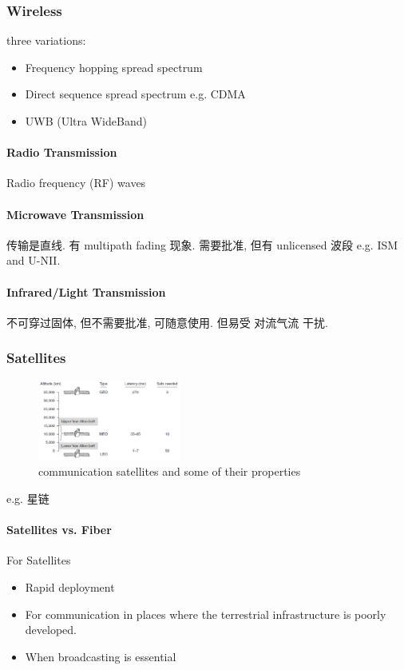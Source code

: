\subsubsection{Wireless}
three variations:
\begin{itemize}
    \item Frequency hopping spread spectrum
    \item Direct sequence spread spectrum e.g. CDMA
    \item UWB (Ultra WideBand)
\end{itemize}

\paragraph{Radio Transmission} Radio frequency (RF) waves 

\paragraph{Microwave Transmission} 传输是直线. 有 multipath fading 现象. 需要批准, 但有 unlicensed 波段 e.g. ISM and U-NII. 

\paragraph{Infrared/Light  Transmission} 不可穿过固体, 但不需要批准, 可随意使用. 但易受 对流气流 干扰. 

\subsubsection{Satellites}
\begin{figure}[!htb]
    \centering
    \includegraphics[width=0.42\textwidth]{pic/CN2/communication satellites and some of their properties}
    \caption{communication satellites and some of their properties}
\end{figure}

e.g. 星链

\paragraph{Satellites vs. Fiber} For Satellites
\begin{itemize}
    \item Rapid deployment
    \item For communication in places where the terrestrial infrastructure is poorly
    developed.
    \item When broadcasting is essential
\end{itemize}

